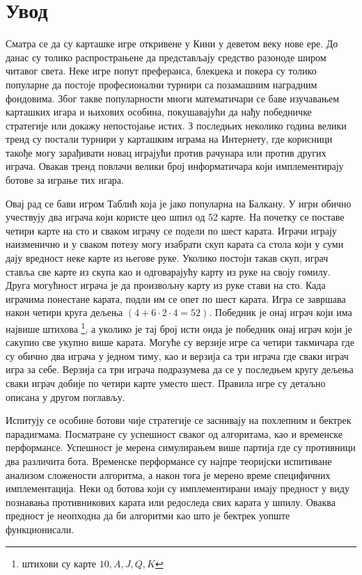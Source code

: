 \documentclass[a4paper, 12pt, ngerman]{article}
\let\oldsection\section
\renewcommand\section{\clearpage\oldsection}
\begin{document}
\pagebreak
\tableofcontents
\pagebreak

\section{Увод}
Сматра се да су карташке игре откривене у Кини у деветом веку нове ере. До данас су толико распрострањене да представљају средство разоноде широм читавог света. Неке игре попут преферанса, блекџека и покера су толико популарне да постоје професионални турнири са позамашним наградним фондовима. Због такве популарности многи математичари се баве изучавањем карташких игара и њихових особина, покушавајући да нађу победничке стратегије или докажу непостојање истих. З последњих неколико година велики тренд су постали турнири у карташким играма на Интернету, где корисници такође могу зарађивати новац играјући против рачунара или против других играча. Овакав тренд повлачи велики број информатичара који имплементирају ботове за играње тих игара.

Овај рад се бави игром Таблић која је јако популарна на Балкану. У игри обично учествују два играча који користе цео шпил од 52 карте. На почетку се поставе четири карте на сто и сваком играчу се подели по шест карата. Играчи играју наизменично и у сваком потезу могу изабрати скуп карата са стола који у суми дају вредност неке карте из његове руке. Уколико постоји такав скуп, играч ставља све карте из скупа као и одговарајућу карту из руке на своју гомилу. Друга могућност играча је да произвољну карту из руке стави на сто. Када играчима понестане карата, подли им се опет по шест карата. Игра се завршава након четири круга дељења $(4 + 6 \cdot 2 \cdot 4 = 52)$. Победник је онај играч који има највише штихова \footnote{штихови су карте $10, A, J, Q, K$}, а уколико је тај број исти онда је победник онај играч који је сакупио све укупно више карата. Могуће су верзије игре са четири такмичара где су обично два играча у једном тиму, као и верзија са три играча где сваки играч игра за себе. Верзија са три играча подразумева да се у последњем кругу дељења сваки играч добије по четири карте уместо шест. Правила игре су детаљно описана у другом поглављу.

Испитују се особине ботови чије стратегије се заснивају на похлепним и бектрек парадигмама. Посматране су успешност сваког од алгоритама, као и временске перформансе. Успешност је мерена симулирањем више партија где су противници два различита бота. Временске перформансе су најпре теоријски испитиване анализом сложености алгоритма, а након тога је мерено време специфичних имплементација. Неки од ботова који су имплементирани имају предност у виду познавања противникових карата или редоследа свих карата у шпилу. Оваква предност је неопходна да би алгоритми као што је бектрек уопште функционисали.
\end{document}
